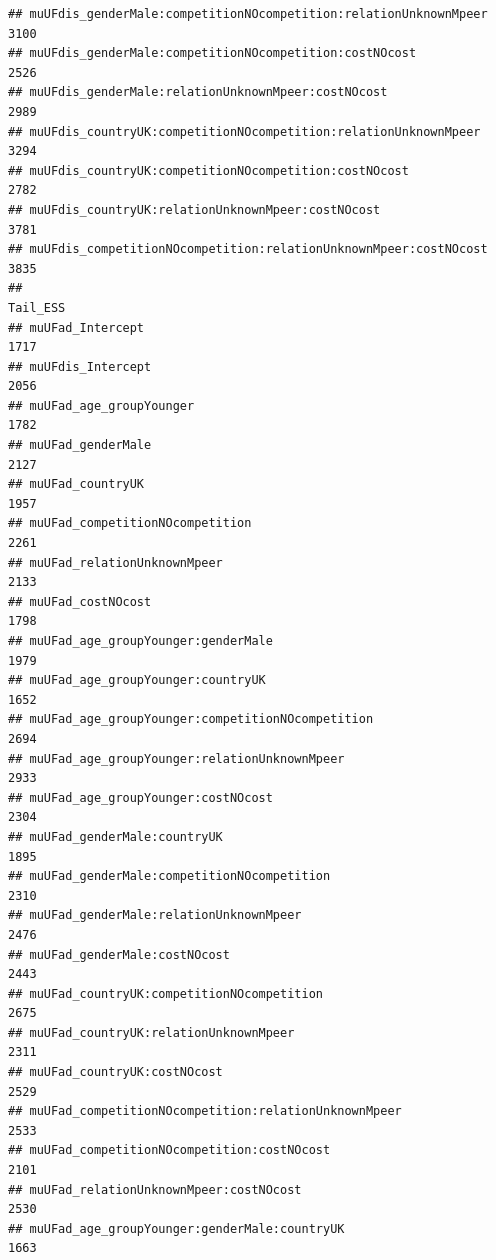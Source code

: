 \documentclass[
]{article}
\begin{document}
\begin{verbatim}
## muUFdis_genderMale:competitionNOcompetition:relationUnknownMpeer           3100
## muUFdis_genderMale:competitionNOcompetition:costNOcost                     2526
## muUFdis_genderMale:relationUnknownMpeer:costNOcost                         2989
## muUFdis_countryUK:competitionNOcompetition:relationUnknownMpeer            3294
## muUFdis_countryUK:competitionNOcompetition:costNOcost                      2782
## muUFdis_countryUK:relationUnknownMpeer:costNOcost                          3781
## muUFdis_competitionNOcompetition:relationUnknownMpeer:costNOcost           3835
##                                                                        Tail_ESS
## muUFad_Intercept                                                           1717
## muUFdis_Intercept                                                          2056
## muUFad_age_groupYounger                                                    1782
## muUFad_genderMale                                                          2127
## muUFad_countryUK                                                           1957
## muUFad_competitionNOcompetition                                            2261
## muUFad_relationUnknownMpeer                                                2133
## muUFad_costNOcost                                                          1798
## muUFad_age_groupYounger:genderMale                                         1979
## muUFad_age_groupYounger:countryUK                                          1652
## muUFad_age_groupYounger:competitionNOcompetition                           2694
## muUFad_age_groupYounger:relationUnknownMpeer                               2933
## muUFad_age_groupYounger:costNOcost                                         2304
## muUFad_genderMale:countryUK                                                1895
## muUFad_genderMale:competitionNOcompetition                                 2310
## muUFad_genderMale:relationUnknownMpeer                                     2476
## muUFad_genderMale:costNOcost                                               2443
## muUFad_countryUK:competitionNOcompetition                                  2675
## muUFad_countryUK:relationUnknownMpeer                                      2311
## muUFad_countryUK:costNOcost                                                2529
## muUFad_competitionNOcompetition:relationUnknownMpeer                       2533
## muUFad_competitionNOcompetition:costNOcost                                 2101
## muUFad_relationUnknownMpeer:costNOcost                                     2530
## muUFad_age_groupYounger:genderMale:countryUK                               1663

\end{verbatim}
\end{document}

